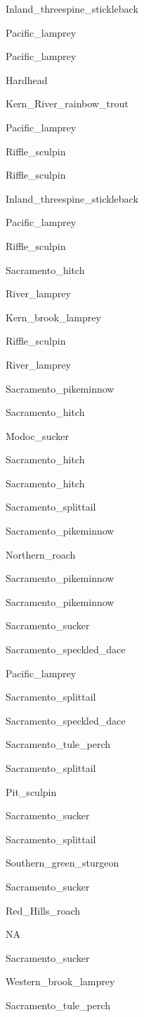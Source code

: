 \documentclass[]{article}
\begin{document}
Inland\_threespine\_stickleback

Pacific\_lamprey

Pacific\_lamprey

Hardhead

Kern\_River\_rainbow\_trout

Pacific\_lamprey

Riffle\_sculpin

Riffle\_sculpin

Inland\_threespine\_stickleback

Pacific\_lamprey

Riffle\_sculpin

Sacramento\_hitch

River\_lamprey

Kern\_brook\_lamprey

Riffle\_sculpin

River\_lamprey

Sacramento\_pikeminnow

Sacramento\_hitch

Modoc\_sucker

Sacramento\_hitch

Sacramento\_hitch

Sacramento\_splittail

Sacramento\_pikeminnow

Northern\_roach

Sacramento\_pikeminnow

Sacramento\_pikeminnow

Sacramento\_sucker

Sacramento\_speckled\_dace

Pacific\_lamprey

Sacramento\_splittail

Sacramento\_speckled\_dace

Sacramento\_tule\_perch

Sacramento\_splittail

Pit\_sculpin

Sacramento\_sucker

Sacramento\_splittail

Southern\_green\_sturgeon

Sacramento\_sucker

Red\_Hills\_roach

NA

Sacramento\_sucker

Western\_brook\_lamprey

Sacramento\_tule\_perch
\end{document}
